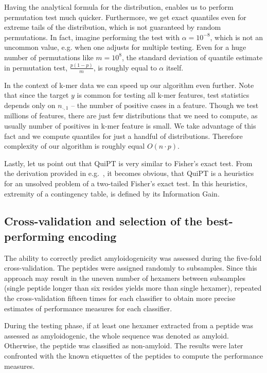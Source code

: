 \documentclass[a4,center,fleqn]{NAR}
\begin{document}
  Having the analytical formula for the distribution, enables us to perform 
permutation test much quicker. Furthermore, we get exact quantiles even for 
extreme tails of the distribution, which is not guaranteed by random 
permutations. In fact, imagine performing the test with $\alpha=10^{-8}$, which 
is not an uncommon value, e.g. when one adjusts for multiple testing. Even for a 
huge number of permutations like $m=10^8$, the standard deviation of quantile 
estimate in permutation test, $\frac{p(1-p)}{m}$, is roughly equal to $\alpha$ 
itself.

  In the context of k-mer data we can speed up our algorithm even further. Note 
that since the target $y$ is common for testing all k-mer features, test 
statistics depends only on $n_{\cdot, 1}$ -- the number of positive cases in a 
feature. Though we test millions of features, there are just few distributions 
that we need to compute, as usually number of positives in k-mer feature is 
small. We take advantage of this fact and we compute quantiles for just a 
handful of distributions. Therefore complexity of our algorithm is roughly equal 
$O(n\cdot p)$.

  Lastly, let us point out that QuiPT is very similar to Fisher's exact test. 
From the derivation provided in e.g.~\citep{lehmann_testing_2008}, it becomes 
obvious, that QuiPT is a heuristics for an unsolved problem of a two-tailed 
Fisher's exact test. In this heuristics, extremity of a contingency table, is 
defined by its Information Gain.

\subsection{Cross-validation and selection of the best-performing encoding}

The ability to correctly predict amyloidogenicity was assessed during the 
five-fold cross-validation. The peptides were assigned randomly to 
subsamples. Since this approach may result in the uneven number of hexamers 
between subsamples (single peptide longer than six resides yields more than 
single hexamer), repeated the cross-validation fifteen times for each classifier 
to obtain more precise estimates of performance measures for each classifier. 

  During the testing phase, if at least one hexamer extracted from a peptide was 
assessed as amyloidogenic, the whole sequence was denoted as amyloid. Otherwise,
the peptide was classified as non-amyloid. The results were later confronted with 
the known etiquettes of the peptides to compute the performance measures.
\end{document}
